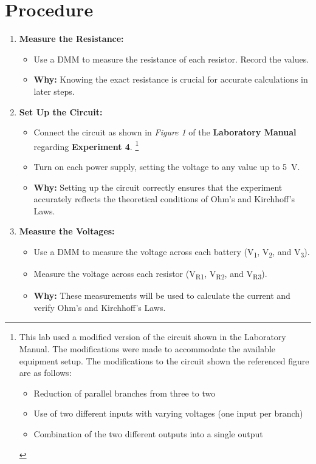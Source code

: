 \documentclass[11pt]{article}
\begin{document}
\section{Procedure}
    \begin{enumerate}
        \item \textbf{Measure the Resistance:}
        \begin{itemize}
            \item Use a DMM to measure the resistance of each resistor. Record the values.
            \item \textbf{Why:} Knowing the exact resistance is crucial for accurate calculations in later steps.
        \end{itemize}
        \item \textbf{Set Up the Circuit:}
        \begin{itemize}
            \item Connect the circuit as shown in \textit{Figure 1} of the \textbf{Laboratory Manual} regarding \textbf{Experiment 4}.
            \footnote{This lab used a modified version of the circuit shown in the Laboratory Manual.
                The modifications were made to accommodate the available equipment setup.
                The modifications to the circuit shown the referenced figure are as follows:
                \begin{itemize}
                    \item Reduction of parallel branches from three to two
                    \item Use of two different inputs with varying voltages (one input per branch)
                    \item Combination of the two different outputs into a single output
                \end{itemize}
            }
            \item Turn on each power supply, setting the voltage to any value up to \SI{5}{\volt}.
            \item \textbf{Why:} Setting up the circuit correctly ensures that the experiment accurately reflects the theoretical conditions of Ohm’s and Kirchhoff’s Laws.
        \end{itemize}
        \item \textbf{Measure the Voltages:}
        \begin{itemize}
            \item Use a DMM to measure the voltage across each battery (\si{\volt_1}, \si{\volt_2}, and \si{\volt_3}).
            \item Measure the voltage across each resistor (\si{\volt_{R1}}, \si{\volt_{R2}}, and \si{\volt_{R3}}).
            \item \textbf{Why:} These measurements will be used to calculate the current and verify Ohm’s and Kirchhoff’s Laws.
        \end{itemize}
    \end{enumerate}
\end{document}
